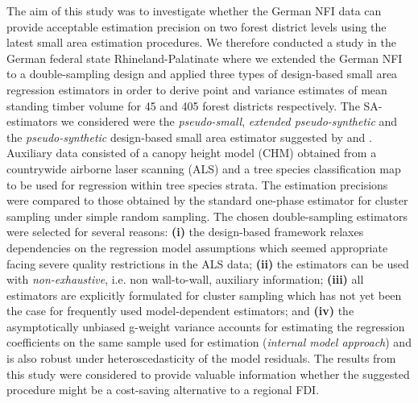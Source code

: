 The aim of this study was to investigate whether the German NFI data can provide acceptable estimation precision on two forest district levels using the latest small area estimation procedures. We therefore conducted a study in the German federal state Rhineland-Palatinate where we extended the German NFI to a double-sampling design and applied three types of design-based small area regression estimators in order to derive point and variance estimates of mean standing timber volume for 45 and 405 forest districts respectively. The SA-estimators we considered were the \textit{pseudo-small}, \textit{extended pseudo-synthetic} and the \textit{pseudo-synthetic} design-based small area estimator suggested by \citet{mandallaz2013a} and \citet{ mandallaz2013b}. Auxiliary data consisted of a canopy height model (CHM) obtained from a countrywide airborne laser scanning (ALS) and a tree species classification map to be used for regression within tree species strata. The estimation precisions were compared to those obtained by the standard one-phase estimator for cluster sampling under simple random sampling. The chosen double-sampling estimators were selected for several reasons: \textbf{(i)} the design-based framework relaxes dependencies on the regression model assumptions which seemed appropriate facing severe quality restrictions in the ALS data; \textbf{(ii)} the estimators can be used with \textit{non-exhaustive}, i.e. non wall-to-wall, auxiliary information; \textbf{(iii)} all estimators are explicitly formulated for cluster sampling which has not yet been the case for frequently used model-dependent estimators; and \textbf{(iv)} the asymptotically unbiased g-weight variance accounts for estimating the regression coefficients on the same sample used for estimation (\textit{internal model approach}) and is also robust under heteroscedasticity of the model residuals. The results from this study were considered to provide valuable information whether the suggested procedure might be a cost-saving alternative to a regional FDI.\par

 


